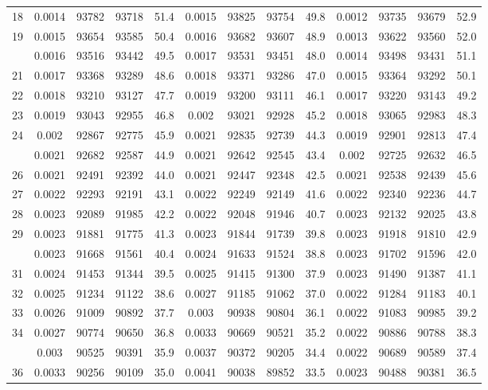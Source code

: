 \documentclass[
  14pt,
]{article}
\begin{document}
\begin{longtable}[t]{lcccccccccccc}
18 & 0.0014 & 93782 & 93718 & 51.4 & 0.0015 & 93825 & 93754 & 49.8 & 0.0012 & 93735 & 93679 & 52.9\\
19 & 0.0015 & 93654 & 93585 & 50.4 & 0.0016 & 93682 & 93607 & 48.9 & 0.0013 & 93622 & 93560 & 52.0\\
\addlinespace
20 & 0.0016 & 93516 & 93442 & 49.5 & 0.0017 & 93531 & 93451 & 48.0 & 0.0014 & 93498 & 93431 & 51.1\\
21 & 0.0017 & 93368 & 93289 & 48.6 & 0.0018 & 93371 & 93286 & 47.0 & 0.0015 & 93364 & 93292 & 50.1\\
22 & 0.0018 & 93210 & 93127 & 47.7 & 0.0019 & 93200 & 93111 & 46.1 & 0.0017 & 93220 & 93143 & 49.2\\
23 & 0.0019 & 93043 & 92955 & 46.8 & 0.002 & 93021 & 92928 & 45.2 & 0.0018 & 93065 & 92983 & 48.3\\
24 & 0.002 & 92867 & 92775 & 45.9 & 0.0021 & 92835 & 92739 & 44.3 & 0.0019 & 92901 & 92813 & 47.4\\
\addlinespace
25 & 0.0021 & 92682 & 92587 & 44.9 & 0.0021 & 92642 & 92545 & 43.4 & 0.002 & 92725 & 92632 & 46.5\\
26 & 0.0021 & 92491 & 92392 & 44.0 & 0.0021 & 92447 & 92348 & 42.5 & 0.0021 & 92538 & 92439 & 45.6\\
27 & 0.0022 & 92293 & 92191 & 43.1 & 0.0022 & 92249 & 92149 & 41.6 & 0.0022 & 92340 & 92236 & 44.7\\
28 & 0.0023 & 92089 & 91985 & 42.2 & 0.0022 & 92048 & 91946 & 40.7 & 0.0023 & 92132 & 92025 & 43.8\\
29 & 0.0023 & 91881 & 91775 & 41.3 & 0.0023 & 91844 & 91739 & 39.8 & 0.0023 & 91918 & 91810 & 42.9\\
\addlinespace
30 & 0.0023 & 91668 & 91561 & 40.4 & 0.0024 & 91633 & 91524 & 38.8 & 0.0023 & 91702 & 91596 & 42.0\\
31 & 0.0024 & 91453 & 91344 & 39.5 & 0.0025 & 91415 & 91300 & 37.9 & 0.0023 & 91490 & 91387 & 41.1\\
32 & 0.0025 & 91234 & 91122 & 38.6 & 0.0027 & 91185 & 91062 & 37.0 & 0.0022 & 91284 & 91183 & 40.1\\
33 & 0.0026 & 91009 & 90892 & 37.7 & 0.003 & 90938 & 90804 & 36.1 & 0.0022 & 91083 & 90985 & 39.2\\
34 & 0.0027 & 90774 & 90650 & 36.8 & 0.0033 & 90669 & 90521 & 35.2 & 0.0022 & 90886 & 90788 & 38.3\\
\addlinespace
35 & 0.003 & 90525 & 90391 & 35.9 & 0.0037 & 90372 & 90205 & 34.4 & 0.0022 & 90689 & 90589 & 37.4\\
36 & 0.0033 & 90256 & 90109 & 35.0 & 0.0041 & 90038 & 89852 & 33.5 & 0.0023 & 90488 & 90381 & 36.5\\

\end{longtable}
\end{document}
